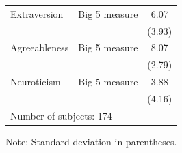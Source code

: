 \documentclass[11pt,a4paper]{article}
\theoremstyle{definition}
\begin{document}
\begin{table}[!ht]
\begin{threeparttable}
\begin{footnotesize}
\begin{tabular}{@{}llc@{}}
Extraversion      &    Big 5 measure         & 6.07     \\
                  &             & (3.93)   \\
Agreeableness     &       Big 5 measure      & 8.07     \\
                  &             & (2.79)   \\
Neuroticism       &     Big 5 measure        & 3.88     \\
                  &             & (4.16)   \\ \midrule
\multicolumn{3}{l}{Number of subjects: 174}      \\ \bottomrule\bottomrule
\end{tabular}
\end{footnotesize}
\begin{tablenotes}
      \footnotesize
      \item Note: Standard deviation in parentheses.
    \end{tablenotes}
\end{threeparttable}
\end{table}
\end{document}
